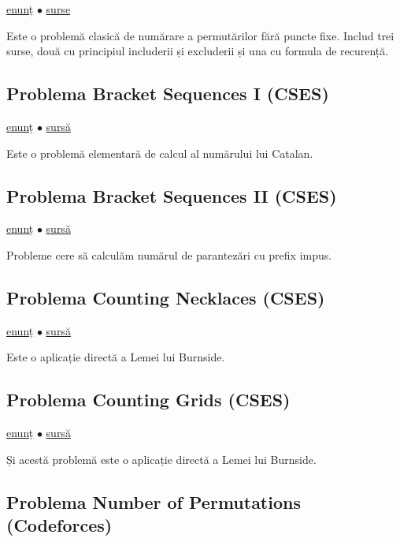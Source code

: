 \documentclass[../main.tex]{subfiles}
\begin{document}
\href{https://cses.fi/problemset/task/1717}{enunț}
$\bullet$
\hyperref[code:christmas-party]{surse}

Este o problemă clasică de numărare a permutărilor fără puncte fixe. Includ trei surse, două cu principiul includerii și excluderii și una cu formula de recurență.

\subsection{Problema Bracket Sequences I (CSES)}
\label{problem:bracket-sequences-1}

\href{https://cses.fi/problemset/task/2064}{enunț}
$\bullet$
\hyperref[code:bracket-sequences-1]{sursă}

Este o problemă elementară de calcul al numărului lui Catalan.

\subsection{Problema Bracket Sequences II (CSES)}
\label{problem:bracket-sequences-2}

\href{https://cses.fi/problemset/task/2187}{enunț}
$\bullet$
\hyperref[code:bracket-sequences-2]{sursă}

Probleme cere să calculăm numărul de parantezări cu prefix impus.

\subsection{Problema Counting Necklaces (CSES)}
\label{problem:counting-necklaces}

\href{https://cses.fi/problemset/task/2209}{enunț}
$\bullet$
\hyperref[code:counting-necklaces]{sursă}

Este o aplicație directă a Lemei lui Burnside.

\subsection{Problema Counting Grids (CSES)}
\label{problem:counting-grids}

\href{https://cses.fi/problemset/task/2210}{enunț}
$\bullet$
\hyperref[code:counting-grids]{sursă}

Și acestă problemă este o aplicație directă a Lemei lui Burnside.

\subsection{Problema Number of Permutations (Codeforces)}
\label{problem:number-of-permutations}
\end{document}
